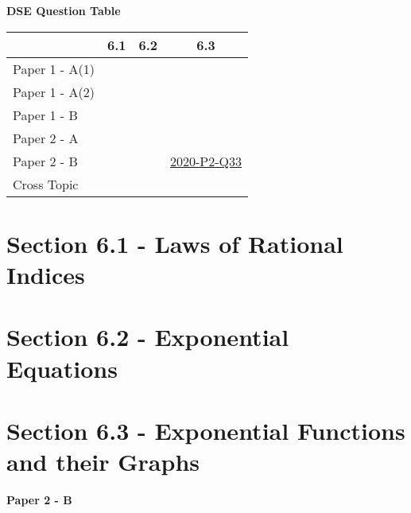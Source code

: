 \documentclass[12pt, a4paper]{article}
\begin{document}
\begin{absolutelynopagebreak}
\begin{center}
\textbf{DSE Question Table}
\end{center}
\begin{center}
\begin{tabular}{|l|c|c|c|}
\hline
        & 6.1 & 6.2 & 6.3 \\\hline
\hline
Paper 1 - A(1)&  &  &  \\
\hline
Paper 1 - A(2)&  &  &  \\
\hline
Paper 1 - B&  &  &  \\
\hline
\hline
Paper 2 - A&  &  &  \\
\hline
Paper 2 - B&  &  & \hyperref[DSE2020-CoreP2-Q33]{2020-P2-Q33} \\
\hline
\hline
Cross Topic&  &  &  \\
\hline
\end{tabular}
\end{center}
\end{absolutelynopagebreak}




\section*{Section 6.1 - Laws of Rational Indices \NF}\label{section:4-6-1}





\section*{Section 6.2 - Exponential Equations \NF}\label{section:4-6-2}





\section*{Section 6.3 - Exponential Functions and their Graphs \NF}\label{section:4-6-3}

\textbf{Paper 2 - B}
\begin{enumx}[label=\arabic*.,start=1]
\item {}\label{DSE2020-CoreP2-Q33} 
\end{enumx}
\end{document}
